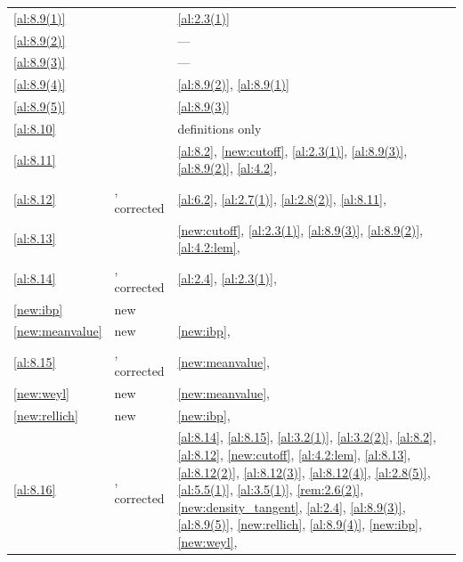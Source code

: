 \begin{center}
\begin{longtable}{p{}p{}p{}}
\ref{al:8.9(1)} & \cite[8.9(1)]{Allard1972} & \ref{al:2.3(1)} \\
\ref{al:8.9(2)} & \cite[8.9(2)]{Allard1972} & --- \\
\ref{al:8.9(3)} & \cite[8.9(3)]{Allard1972} & --- \\
\ref{al:8.9(4)} & \cite[8.9(4)]{Allard1972} & \ref{al:8.9(2)}, \ref{al:8.9(1)} \\
\ref{al:8.9(5)} & \cite[8.9(5)]{Allard1972} & \ref{al:8.9(3)} \\
\ref{al:8.10} & \cite[8.10]{Allard1972} & definitions only \\
\ref{al:8.11} & \cite[8.11]{Allard1972} & \ref{al:8.2}, \ref{new:cutoff}, \ref{al:2.3(1)}, \ref{al:8.9(3)}, \ref{al:8.9(2)}, \ref{al:4.2}, \cite[2.4.9, 4.1.2]{Federer1969} \\
\ref{al:8.12} & \cite[8.12]{Allard1972}, corrected & \ref{al:6.2}, \ref{al:2.7(1)}, \ref{al:2.8(2)}, \ref{al:8.11}, \cite[2.2.5, 2.8.9, 2.8.18, 2.10.11, 2.10.43]{Federer1969} \\
\ref{al:8.13} & \cite[8.13]{Allard1972} & \ref{new:cutoff}, \ref{al:2.3(1)}, \ref{al:8.9(3)}, \ref{al:8.9(2)}, \ref{al:4.2:lem}, \cite[2.4.7]{Federer1969} \\
\ref{al:8.14} & \cite[8.14]{Allard1972}, corrected & \ref{al:2.4}, \ref{al:2.3(1)}, \cite[1.7.5]{Federer1969} \\
\ref{new:ibp} & new & \cite[2.6.2, 2.9.20, 3.1.6]{Federer1969} \\
\ref{new:meanvalue} & new & \ref{new:ibp}, \cite[3.2.13]{Federer1969} \\
\ref{al:8.15} & \cite[8.15]{Allard1972}, corrected & \ref{new:meanvalue}, \cite[2.9.20, 2.10.35, 4.1.2]{Federer1969} \\
\ref{new:weyl} & new & \ref{new:meanvalue}, \cite[2.6.2, 2.8.9, 2.8.18, 2.9.9, 4.1.2]{Federer1969} \\
\ref{new:rellich} & new & \ref{new:ibp}, \cite[2.4.12, 2.10.21, 4.1.2]{Federer1969} \\
\ref{al:8.16} & \cite[8.16]{Allard1972}, corrected & \ref{al:8.14}, \ref{al:8.15}, \ref{al:3.2(1)}, \ref{al:3.2(2)}, \ref{al:8.2}, \ref{al:8.12}, \ref{new:cutoff}, \ref{al:4.2:lem}, \ref{al:8.13}, \ref{al:8.12(2)}, \ref{al:8.12(3)}, \ref{al:8.12(4)}, \ref{al:2.8(5)}, \ref{al:5.5(1)}, \ref{al:3.5(1)}, \ref{rem:2.6(2)}, \ref{new:density_tangent}, \ref{al:2.4}, \ref{al:8.9(3)}, \ref{al:8.9(5)}, \ref{new:rellich}, \ref{al:8.9(4)}, \ref{new:ibp}, \ref{new:weyl}, \cite[1.7.6, 2.4.14, 2.10.11, 3.1.6, 3.2.3, 3.2.5, 3.2.13, 3.2.17]{Federer1969} \\

\end{longtable}
\end{center}

